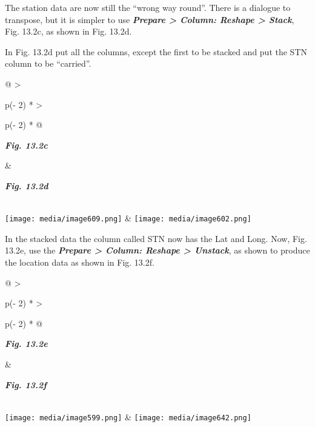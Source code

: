 \documentclass[
  letterpaper,
  DIV=11,
  numbers=noendperiod]{scrreprt}
\begin{document}
The station data are now still the ``wrong way round''. There is a
dialogue to transpose, but it is simpler to use \textbf{\emph{Prepare
\textgreater{} Column: Reshape \textgreater{} Stack}}, Fig. 13.2c, as
shown in Fig. 13.2d.

In Fig. 13.2d put all the columns, except the first to be stacked and
put the STN column to be ``carried''.

\begin{longtable}[]{@{}
  >{\raggedright\arraybackslash}p{(\columnwidth - 2\tabcolsep) * }
  >{\raggedright\arraybackslash}p{(\columnwidth - 2\tabcolsep) * }@{}}
\toprule\noalign{}
\begin{minipage}[b]{\linewidth}\raggedright
\textbf{\emph{Fig. 13.2c}}
\end{minipage} & \begin{minipage}[b]{\linewidth}\raggedright
\textbf{\emph{Fig. 13.2d}}
\end{minipage} \\
\midrule\noalign{}
\endhead
\bottomrule\noalign{}
\endlastfoot
\texttt{[image: media/image609.png]} &
\texttt{[image: media/image602.png]} \\
\end{longtable}

In the stacked data the column called STN now has the Lat and Long. Now,
Fig. 13.2e, use the \textbf{\emph{Prepare \textgreater{} Column: Reshape
\textgreater{} Unstack}}, as shown to produce the location data as shown
in Fig. 13.2f.

\begin{longtable}[]{@{}
  >{\raggedright\arraybackslash}p{(\columnwidth - 2\tabcolsep) * }
  >{\raggedright\arraybackslash}p{(\columnwidth - 2\tabcolsep) * }@{}}
\toprule\noalign{}
\begin{minipage}[b]{\linewidth}\raggedright
\textbf{\emph{Fig. 13.2e}}
\end{minipage} & \begin{minipage}[b]{\linewidth}\raggedright
\textbf{\emph{Fig. 13.2f}}
\end{minipage} \\
\midrule\noalign{}
\endhead
\bottomrule\noalign{}
\endlastfoot
\texttt{[image: media/image599.png]} &
\texttt{[image: media/image642.png]} \\
\end{longtable}
\end{document}
